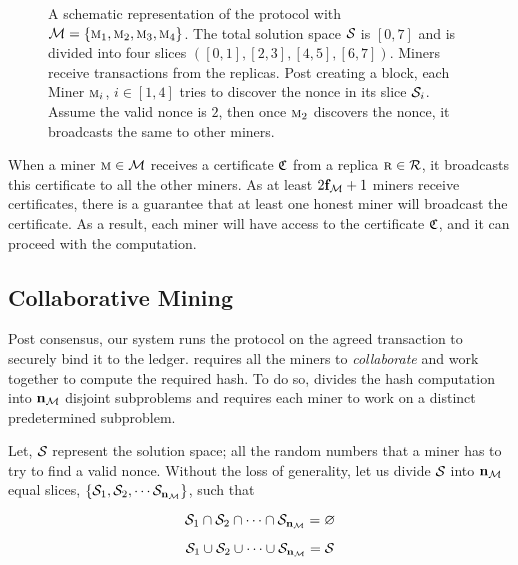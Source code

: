 \begin{figure}[t]
\begin{tikzpicture}[yscale=0.5,xscale=0.75]
    \end{tikzpicture}
    	\caption{A schematic representation of the \PoC{} protocol with 
    	$\Miners{} = \{\Miner_1, \Miner_2, \Miner_3, \Miner_4\}$. 
    	The total solution space $\Slice{}$ is $[0,7]$ and is divided into four 
    	slices $([0,1], [2,3], [4,5], [6,7])$. Miners receive transactions from 
    	the \pbft{} replicas. Post creating a block, each Miner 
    	$\Miner_{i}$, $i \in [1,4]$ tries to discover the nonce in its slice 
    	$\Slice{i}$. Assume the valid nonce is $2$, then once $\Miner_2$ discovers 
    	the nonce, it broadcasts the same to other miners.
	}
	\label{fig:poc}
\end{figure}

When a miner $\Miner \in \Miners$ receives a certificate $\Certificate$ from 
a replica $\Replica \in \Replicas$, it broadcasts this certificate to all the 
other miners. As at least $2\f{\Miners}+1$ miners receive certificates, there 
is a guarantee that at least one honest miner will broadcast the certificate.
As a result, each miner will have access to the certificate $\Certificate$, and 
it can proceed with the \PoC{} computation.


\subsection{Collaborative Mining}
Post \pbft{} consensus, our \DualChain{} system runs the \PoC{} protocol on the 
agreed transaction to securely bind it to the ledger.
\PoC{} requires all the miners to {\em collaborate} and work together to compute 
the required hash. To do so, \PoC{} divides the \PoW{} hash computation into 
$\n{\Miners}$ disjoint subproblems and requires each miner to work on a distinct 
predetermined subproblem.

Let, $\Slice{}$ represent the solution space; all the random numbers that a miner 
has to try to find a valid nonce. Without the loss of generality, let us divide 
$\Slice{}$ into $\n{\Miners}$ equal slices, 
$\{ \Slice{1}, \Slice{2}, \cdots \Slice{\n{\Miners}} \}$, such that%

\begin{equation}
\Slice{1} \cap \Slice{2} \cap \cdots \cap \Slice{\n{\Miners}} = \varnothing 
\end{equation}%

\begin{equation}
\Slice{1} \cup \Slice{2} \cup \cdots \cup \Slice{\n{\Miners}} = \Slice{} 
\end{equation}

